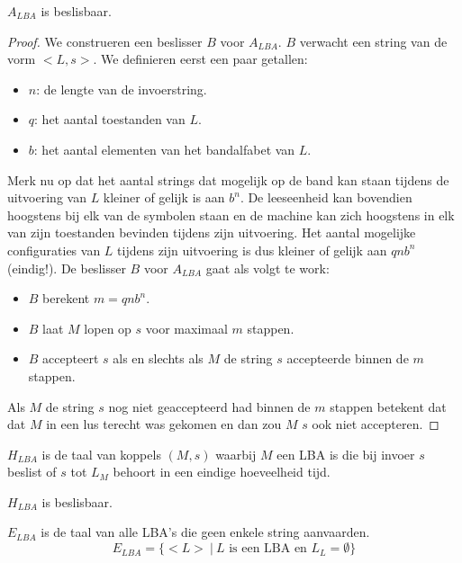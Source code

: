 \documentclass[main.tex]{subfiles}
\begin{document}
\begin{st}
  \label{st:a-lba-is-besl}
  $A_{LBA}$ is beslisbaar.

  \begin{proof}
    We construeren een beslisser $B$ voor $A_{LBA}$.
    $B$ verwacht een string van de vorm $<L,s>$.
    We definieren eerst een paar getallen:
    \begin{itemize}
    \item $n$: de lengte van de invoerstring.
    \item $q$: het aantal toestanden van $L$.
    \item $b$: het aantal elementen van het bandalfabet van $L$.
    \end{itemize}
    Merk nu op dat het aantal strings dat mogelijk op de band kan staan tijdens de uitvoering van $L$ kleiner of gelijk is aan $b^{n}$.
    De leeseenheid kan bovendien hoogstens bij elk van de symbolen staan en de machine kan zich hoogstens in elk van zijn toestanden bevinden tijdens zijn uitvoering.
    Het aantal mogelijke configuraties van $L$ tijdens zijn uitvoering is dus kleiner of gelijk aan $qnb^{n}$ (eindig!).
    De beslisser $B$ voor $A_{LBA}$ gaat als volgt te work:
    \begin{itemize}
    \item $B$ berekent $m = qnb^{n}$.
    \item $B$ laat $M$ lopen op $s$ voor maximaal $m$ stappen.
    \item $B$ accepteert $s$ als en slechts als $M$ de string $s$ accepteerde binnen de $m$ stappen.
    \end{itemize}
    Als $M$ de string $s$ nog niet geaccepteerd had binnen de $m$ stappen betekent dat dat $M$ in een lus terecht was gekomen en dan zou $M$ $s$ ook niet accepteren.
  \end{proof}
\end{st}

\begin{de}
  \label{de:h-lba}
  $H_{LBA}$ is de taal van koppels $(M,s)$ waarbij $M$ een LBA is die bij invoer $s$ beslist of $s$ tot $L_{M}$ behoort in een eindige hoeveelheid tijd.
\end{de}

\begin{st}
  \label{st:h-lba-besl}
  $H_{LBA}$ is beslisbaar.
\end{st}

\begin{de}
  \label{de:e-lba}
  $E_{LBA}$ is de taal van alle LBA's die geen enkele string aanvaarden.
  \[ E_{LBA} = \{ <L> \ |\ L \text{ is een LBA en } L_{L} = \emptyset \} \]
\end{de}
\end{document}
